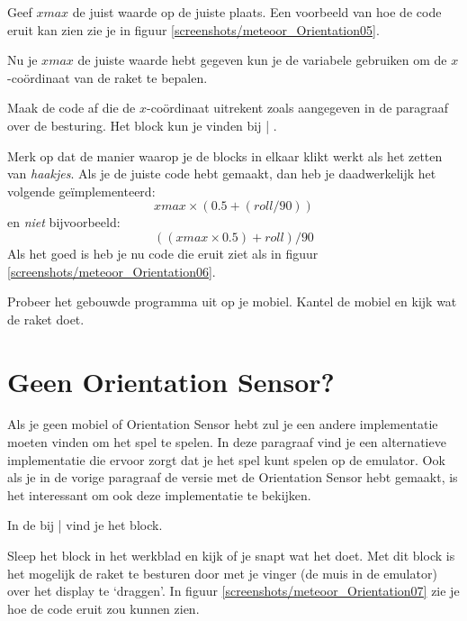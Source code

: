 \begin{opgave}
    \opgVraag
  Geef $xmax$ de juist waarde op de juiste plaats. Een voorbeeld van hoe de code eruit kan zien zie je in figuur \ref{screenshots/meteoor_Orientation05}.
\end{opgave}


Nu je $xmax$ de juiste waarde hebt gegeven kun je de variabele gebruiken om de $x$-co\"ordinaat van de raket te bepalen.

\begin{opgave}
    \opgVraag
  Maak de code af die de $x$-co\"ordinaat uitrekent zoals aangegeven in de paragraaf over de besturing. Het  block kun je vinden bij  | .
\end{opgave}

Merk op dat de manier waarop je de blocks in elkaar klikt werkt als het zetten van \emph{haakjes}. Als je de juiste code hebt gemaakt, dan heb je daadwerkelijk het volgende ge\"implementeerd:
\[
	xmax \times (0.5 + (roll/90))
\]
en \emph{niet} bijvoorbeeld:
\[
	((xmax \times 0.5) + roll)/90  
\]
Als het goed is heb je nu code die eruit ziet als in figuur \ref{screenshots/meteoor_Orientation06}.


\runOpTelefoon{}
Probeer het gebouwde programma uit op je mobiel. Kantel de mobiel en kijk wat de raket doet. 

\section{Geen Orientation Sensor?}
\label{sec:geenOrientationSensor}
Als je geen mobiel of Orientation Sensor hebt zul je een andere implementatie moeten vinden om het spel te spelen. In deze paragraaf vind je een alternatieve implementatie die ervoor zorgt dat je het spel kunt spelen op de emulator. Ook als je in de vorige paragraaf de versie met de Orientation Sensor hebt gemaakt, is het interessant om ook deze implementatie te bekijken.

In de  bij  |  vind je het  block.

\begin{opgave}
    \opgVraag
  Sleep het  block in het werkblad en kijk of je snapt wat het doet. Met dit block is het mogelijk de raket te besturen door met je vinger (de muis in de emulator) over het display te `draggen'. In figuur \ref{screenshots/meteoor_Orientation07} zie je hoe de code eruit zou kunnen zien.
\end{opgave}

